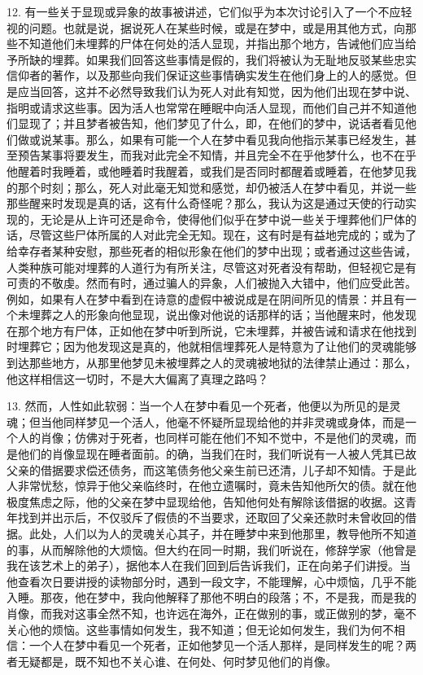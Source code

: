 12. 有一些关于显现或异象的故事被讲述，它们似乎为本次讨论引入了一个不应轻视的问题。也就是说，据说死人在某些时候，或是在梦中，或是用其他方式，向那些不知道他们未埋葬的尸体在何处的活人显现，并指出那个地方，告诫他们应当给予所缺的埋葬。如果我们回答这些事情是假的，我们将被认为无耻地反驳某些忠实信仰者的著作，以及那些向我们保证这些事情确实发生在他们身上的人的感觉。但是应当回答，这并不必然导致我们认为死人对此有知觉，因为他们出现在梦中说、指明或请求这些事。因为活人也常常在睡眠中向活人显现，而他们自己并不知道他们显现了；并且梦者被告知，他们梦见了什么，即，在他们的梦中，说话者看见他们做或说某事。那么，如果有可能一个人在梦中看见我向他指示某事已经发生，甚至预告某事将要发生，而我对此完全不知情，并且完全不在乎他梦什么，也不在乎他醒着时我睡着，或他睡着时我醒着，或我们是否同时都醒着或睡着，在他梦见我的那个时刻；那么，死人对此毫无知觉和感觉，却仍被活人在梦中看见，并说一些那些醒来时发现是真的话，这有什么奇怪呢？那么，我认为这是通过天使的行动实现的，无论是从上许可还是命令，使得他们似乎在梦中说一些关于埋葬他们尸体的话，尽管这些尸体所属的人对此完全无知。现在，这有时是有益地完成的；或为了给幸存者某种安慰，那些死者的相似形象在他们的梦中出现；或者通过这些告诫，人类种族可能对埋葬的人道行为有所关注，尽管这对死者没有帮助，但轻视它是有可责的不敬虔。然而有时，通过骗人的异象，人们被抛入大错中，他们应受此苦。例如，如果有人在梦中看到在诗意的虚假中被说成是在阴间所见的情景：并且有一个未埋葬之人的形象向他显现，说出像对他说的话那样的话；当他醒来时，他发现在那个地方有尸体，正如他在梦中听到所说，它未埋葬，并被告诫和请求在他找到时埋葬它；因为他发现这是真的，他就相信埋葬死人是特意为了让他们的灵魂能够到达那些地方，从那里他梦见未被埋葬之人的灵魂被地狱的法律禁止通过：那么，他这样相信这一切时，不是大大偏离了真理之路吗？\par

13. 然而，人性如此软弱：当一个人在梦中看见一个死者，他便以为所见的是灵魂；但当他同样梦见一个活人，他毫不怀疑所显现给他的并非灵魂或身体，而是一个人的肖像；仿佛对于死者，也同样可能在他们不知不觉中，不是他们的灵魂，而是他们的肖像显现在睡者面前。的确，当我们在时，我们听说有一人被人凭其已故父亲的借据要求偿还债务，而这笔债务他父亲生前已还清，儿子却不知情。于是此人非常忧愁，惊异于他父亲临终时，在他立遗嘱时，竟未告知他所欠的债。就在他极度焦虑之际，他的父亲在梦中显现给他，告知他何处有解除该借据的收据。这青年找到并出示后，不仅驳斥了假债的不当要求，还取回了父亲还款时未曾收回的借据。此处，人们以为人的灵魂关心其子，并在睡梦中来到他那里，教导他所不知道的事，从而解除他的大烦恼。但大约在同一时期，我们听说在，修辞学家（他曾是我在该艺术上的弟子），据他本人在我们回到后告诉我们，正在向弟子们讲授。当他查看次日要讲授的读物部分时，遇到一段文字，不能理解，心中烦恼，几乎不能入睡。那夜，他在梦中，我向他解释了那他不明白的段落；不，不是我，而是我的肖像，而我对这事全然不知，也许远在海外，正在做别的事，或正做别的梦，毫不关心他的烦恼。这些事情如何发生，我不知道；但无论如何发生，我们为何不相信：一个人在梦中看见一个死者，正如他梦见一个活人那样，是同样发生的呢？两者无疑都是，既不知也不关心谁、在何处、何时梦见他们的肖像。\par

